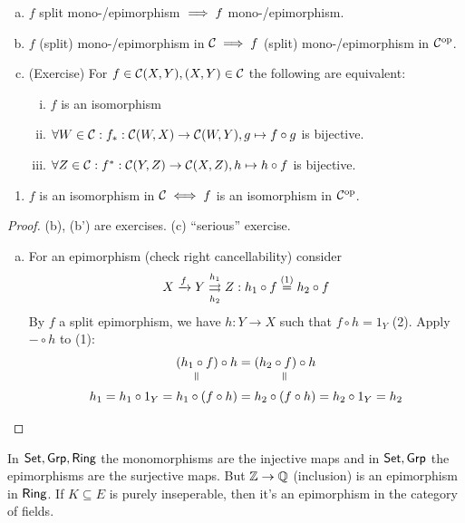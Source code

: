 \documentclass[a4paper]{report}
\begin{document}
\begin{facts}
\begin{enumerate}[(a)]
  \item $f$ split mono-/epimorphism $\implies f$ mono-/epimorphism.
  \item $f$ (split) mono-/epimorphism in $\mathcal{C} \implies f$ (split) mono-/epimorphism in $\mathcal{C}^\mathrm{op}$.
  \item (Exercise) For $f \in \mathcal{C}(X, Y), (X, Y) \in \mathcal{C}$ the following are equivalent:
        \begin{enumerate}[(i)]
          \item $f$ is an isomorphism
                \item $\forall W \in \mathcal{C} : f_{*}: \mathcal{C}(W, X) \to \mathcal{C}(W, Y), g \mapsto f \circ g$ is bijective.
                \item $\forall Z \in \mathcal{C} : f^{*}: \mathcal{C}(Y, Z) \to \mathcal{C}(X, Z), h \mapsto h \circ f$ is bijective.
        \end{enumerate}
\end{enumerate}
\begin{enumerate}[(b')]
\item $f$ is an isomorphism in $\mathcal{C} \iff f$ is an isomorphism in $\mathcal{C}^\mathrm{op}$.
\end{enumerate}

\begin{proof}(b), (b') are exercises. (c) ``serious'' exercise.
  \begin{enumerate}[(a)]
    \item For an epimorphism (check right cancellability) consider
          \[X \xrightarrow f Y \overunderset {h_{1}}{h_{2}}\rightrightarrows  Z: h_{1} \circ f \overset{(1)}= h_{2} \circ f\]
          By $f$ a split epimorphism, we have $h: Y \to X$ such that $f \circ h = 1_{Y}$ (2). Apply $-\circ h$ to (1):
          \begin{align*} %
            \underset {\verteq} {(h_{1} \circ f)} \circ h & = \underset{\verteq}{(h_{2} \circ f) \circ h}\\
             h_{1} = h_{1} \circ 1_{Y}= h_{1} \circ (f \circ h) &= h_{2} \circ (f \circ h) = h_{2} \circ 1_{Y} = h_{2}
          \end{align*}\qedhere
  \end{enumerate}
\end{proof}
\end{facts}


\begin{exmps*}
In $\mathsf{Set}, \mathsf{Grp}, \mathsf{Ring}$ the monomorphisms are the injective maps and in $\mathsf{Set}, \mathsf{Grp}$ the epimorphisms are the surjective maps. But $\mathbb{Z} \to \mathbb{Q}$ (inclusion) is an epimorphism in $\mathsf{Ring}$. If $K \subseteq E$ is purely inseperable, then it's an epimorphism in the category of fields.
\end{exmps*}
\end{document}
